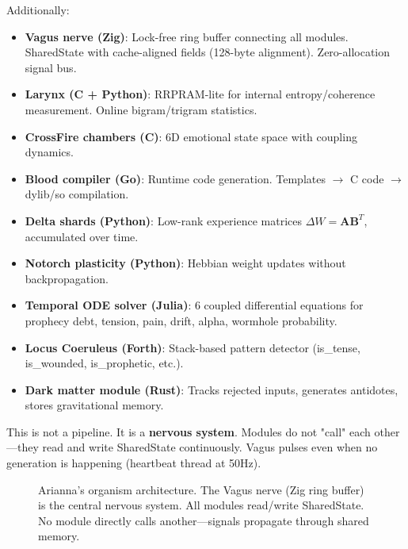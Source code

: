 \documentclass[11pt,a4paper]{article}
\begin{document}
Additionally:

\begin{itemize}
\item \textbf{Vagus nerve (Zig)}: Lock-free ring buffer connecting all modules. SharedState with cache-aligned fields (128-byte alignment). Zero-allocation signal bus.
\item \textbf{Larynx (C + Python)}: RRPRAM-lite for internal entropy/coherence measurement. Online bigram/trigram statistics.
\item \textbf{CrossFire chambers (C)}: 6D emotional state space with coupling dynamics.
\item \textbf{Blood compiler (Go)}: Runtime code generation. Templates $\to$ C code $\to$ dylib/so compilation.
\item \textbf{Delta shards (Python)}: Low-rank experience matrices $\Delta W = \mathbf{A} \mathbf{B}^T$, accumulated over time.
\item \textbf{Notorch plasticity (Python)}: Hebbian weight updates without backpropagation.
\item \textbf{Temporal ODE solver (Julia)}: 6 coupled differential equations for prophecy debt, tension, pain, drift, alpha, wormhole probability.
\item \textbf{Locus Coeruleus (Forth)}: Stack-based pattern detector (is\_tense, is\_wounded, is\_prophetic, etc.).
\item \textbf{Dark matter module (Rust)}: Tracks rejected inputs, generates antidotes, stores gravitational memory.
\end{itemize}

This is not a pipeline. It is a \textbf{nervous system}. Modules do not "call" each other—they read and write SharedState continuously. Vagus pulses even when no generation is happening (heartbeat thread at 50Hz).

\begin{figure}[h]
\centering
{}
\caption{Arianna's organism architecture. The Vagus nerve (Zig ring buffer) is the central nervous system. All modules read/write SharedState. No module directly calls another—signals propagate through shared memory.}
\label{fig:architecture}
\end{figure}
\end{document}
